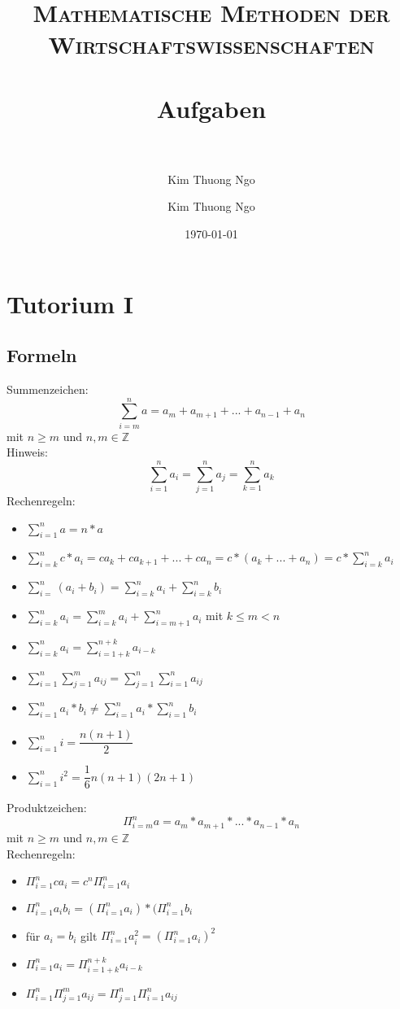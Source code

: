 \documentclass[paper=a4, fontsize=11pt]{scrartcl}
\author{Kim Thuong Ngo}
\title{
\normalfont \normalsize
\textsc{Mathematische Methoden der Wirtschaftswissenschaften} \\ [25pt]
\horrule{0.5pt} \\[0.4cm]
\huge Aufgaben \\
\horrule{2pt} \\[0.5cm]
}
\author{Kim Thuong Ngo}
\date{\normalsize\today}
\numberwithin{equation}{section}
\numberwithin{figure}{section}
\numberwithin{table}{section}
\begin{document}
\maketitle

\newpage

\tableofcontents

\newpage
\section{Tutorium I}
\subsection{Formeln}
Summenzeichen: $$\sum^{n}_{i=m}a = 
a_{m}+a_{m+1}+...+a_{n-1}+a_{n}$$ mit $n \geq m$ und $n,m \in \mathbb{Z}$ \\
Hinweis: $$\sum^{n}_{i=1}a_{i} 
= \sum^{n}_{j=1}a_{j}
= \sum^{n}_{k=1}a_{k}  $$ 
Rechenregeln:
\begin{itemize}
\item $\sum^{n}_{i=1}a = n*a$
\item $\sum^{n}_{i=k}c*a_{i} 
= ca_{k} +ca_{k+1}+...+ca_{n}
= c*(a_{k}+...+a_{n})
= c* \sum^{n}_{i=k}a_{i} $
\item $\sum^{n}_{i=}(a_{i}+b_{i})
= \sum^{n}_{i=k}a_{i}  + \sum^{n}_{i=k}b_{i} $
\item $\sum^{n}_{i=k}a_{i} 
= \sum^{m}_{i=k}a_{i} + \sum^{n}_{i=m+1}a_{i}$ mit $k \leq m < n$
\item $\sum^{n}_{i=k}a_{i} 
= \sum^{n+k}_{i=1+k}a_{i-k}$
\item $\sum^{n}_{i=1} \sum^{m}_{j=1}a_{ij}
= \sum^{n}_{j=1} \sum^{n}_{i=1}a_{ij} $
\item $\sum^{n}_{i=1}a_{i}*b_{i} 
\neq \sum^{n}_{i=1}a_{i} * \sum^{n}_{i=1}b_{i}$
\item $\sum^{n}_{i=1}i = \dfrac{n(n+1)}{2}$
\item $\sum^{n}_{i=1}i^{2} = \dfrac{1}{6}n(n+1)(2n+1)$
\end{itemize}

Produktzeichen: $$\Pi^{n}_{i=m}a = 
a_{m}*a_{m+1}*...*a_{n-1}*a_{n}$$ mit $n \geq m$ und $n,m \in \mathbb{Z}$ \\
Rechenregeln:
\begin{itemize}
\item $\Pi^{n}_{i=1}ca_{i}
=c^{n} \Pi^{n}_{i=1}a_{i}$
\item $\Pi^{n}_{i=1}a_{i}b_{i}
= ( \Pi^{n}_{i=1}a_{i} ) * ( \Pi^{n}_{i=1}b_{i} $
\item für $a_{i} = b_{i}$ gilt 
$ \Pi^{n}_{i=1}a_{i}^{2} = ( \Pi^{n}_{i=1}a_{i}) ^{2}$
\item $\Pi^{n}_{i=1}a_{i} 
= \Pi^{n+k}_{i=1+k}a_{i-k}$
\item $\Pi^{n}_{i=1} \Pi^{m}_{j=1}a_{ij}
= \Pi^{n}_{j=1} \Pi^{n}_{i=1}a_{ij} $
\end{itemize}
\end{document}
